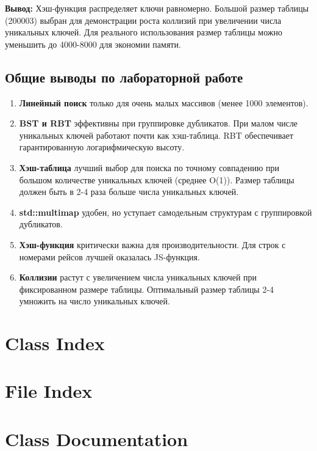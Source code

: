 \documentclass[twoside]{book}
\newcommand{\+}{\discretionary{\mbox{\scriptsize$\hookleftarrow$}}{}{}}
\begin{document}
\textbf{Вывод:} Хэш-функция распределяет ключи равномерно. 
Большой размер таблицы (200003) выбран для демонстрации роста коллизий при увеличении числа уникальных ключей.
Для реального использования размер таблицы можно уменьшить до 4000-8000 для экономии памяти.

\newpage

\section{Общие выводы по лабораторной работе}

\begin{enumerate}
    \item \textbf{Линейный поиск} только для очень малых массивов (менее 1000 элементов).
    
    \item \textbf{BST и RBT} эффективны при группировке дубликатов.
          При малом числе уникальных ключей работают почти как хэш-таблица.
          RBT обеспечивает гарантированную логарифмическую высоту.
    
    \item \textbf{Хэш-таблица} лучший выбор для поиска по точному совпадению
          при большом количестве уникальных ключей (среднее O(1)).
          Размер таблицы должен быть в 2-4 раза больше числа уникальных ключей.
    
    \item \textbf{std::multimap} удобен, но уступает самодельным структурам с группировкой дубликатов.
    
    \item \textbf{Хэш-функция} критически важна для производительности.
          Для строк с номерами рейсов лучшей оказалась JS-функция.
    
    \item \textbf{Коллизии} растут с увеличением числа уникальных ключей при фиксированном размере таблицы.
          Оптимальный размер таблицы 2-4 умножить на число уникальных ключей.
\end{enumerate}
\chapter{Class Index}

\chapter{File Index}

\chapter{Class Documentation}










\end{document}
